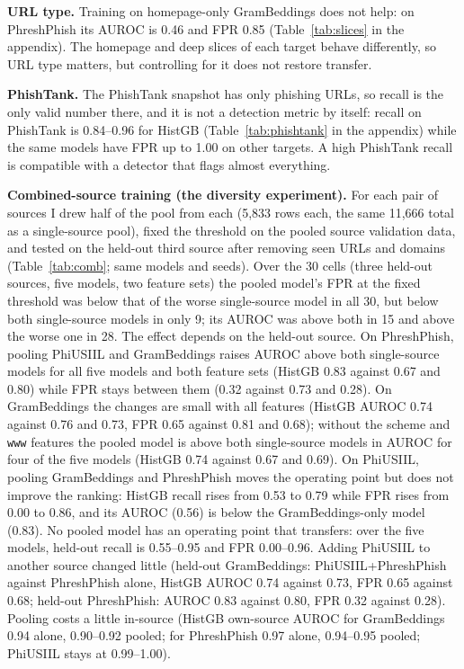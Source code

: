 \documentclass[10pt]{article}
\begin{document}
\textbf{URL type.} Training on homepage-only GramBeddings does not help: on PhreshPhish its AUROC is 0.46 and FPR 0.85 (Table~\ref{tab:slices} in the appendix). The homepage and deep slices of each target behave differently, so URL type matters, but controlling for it does not restore transfer.

\textbf{PhishTank.} The PhishTank snapshot has only phishing URLs, so recall is the only valid number there, and it is not a detection metric by itself: recall on PhishTank is 0.84--0.96 for HistGB (Table~\ref{tab:phishtank} in the appendix) while the same models have FPR up to 1.00 on other targets. A high PhishTank recall is compatible with a detector that flags almost everything.

\textbf{Combined-source training (the diversity experiment).} For each pair of sources I drew half of the pool from each (5,833 rows each, the same 11,666 total as a single-source pool), fixed the threshold on the pooled source validation data, and tested on the held-out third source after removing seen URLs and domains (Table~\ref{tab:comb}; same models and seeds). Over the 30 cells (three held-out sources, five models, two feature sets) the pooled model's FPR at the fixed threshold was below that of the worse single-source model in all 30, but below both single-source models in only 9; its AUROC was above both in 15 and above the worse one in 28. The effect depends on the held-out source. On PhreshPhish, pooling PhiUSIIL and GramBeddings raises AUROC above both single-source models for all five models and both feature sets (HistGB 0.83 against 0.67 and 0.80) while FPR stays between them (0.32 against 0.73 and 0.28). On GramBeddings the changes are small with all features (HistGB AUROC 0.74 against 0.76 and 0.73, FPR 0.65 against 0.81 and 0.68); without the scheme and \texttt{www} features the pooled model is above both single-source models in AUROC for four of the five models (HistGB 0.74 against 0.67 and 0.69). On PhiUSIIL, pooling GramBeddings and PhreshPhish moves the operating point but does not improve the ranking: HistGB recall rises from 0.53 to 0.79 while FPR rises from 0.00 to 0.86, and its AUROC (0.56) is below the GramBeddings-only model (0.83). No pooled model has an operating point that transfers: over the five models, held-out recall is 0.55--0.95 and FPR 0.00--0.96. Adding PhiUSIIL to another source changed little (held-out GramBeddings: PhiUSIIL+PhreshPhish against PhreshPhish alone, HistGB AUROC 0.74 against 0.73, FPR 0.65 against 0.68; held-out PhreshPhish: AUROC 0.83 against 0.80, FPR 0.32 against 0.28). Pooling costs a little in-source (HistGB own-source AUROC for GramBeddings 0.94 alone, 0.90--0.92 pooled; for PhreshPhish 0.97 alone, 0.94--0.95 pooled; PhiUSIIL stays at 0.99--1.00).
\end{document}
